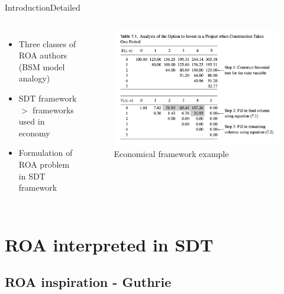 \documentclass[us]{beamer}
\begin{document}
\begin{frame}{Introduction}{Detailed}

\begin{columns}
	\begin{itemize}
		\item {Three classes of ROA authors (BSM model analogy)}
		\item {SDT framework $>$ frameworks used in economy}
		\item {Formulation of ROA problem in SDT framework}
	\end{itemize}	
	\begin{figure}
		\includegraphics[scale=0.35]{Guthrie.png}
		\caption{Economical framework example \cite{Guthrie}}
	\end{figure}
\end{columns}	

\end{frame}




\section{ROA interpreted in SDT}

\subsection{ROA inspiration - Guthrie}
\end{document}

